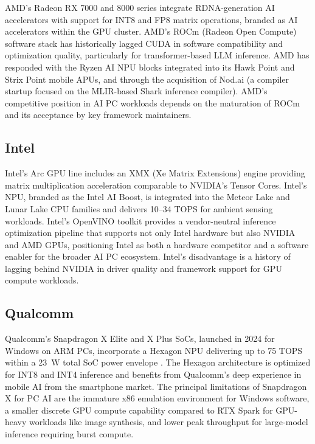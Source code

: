 \documentclass[conference]{IEEEtran}
\begin{document}
AMD's Radeon RX 7000 and 8000 series integrate RDNA-generation AI accelerators with support for INT8 and FP8 matrix operations, branded as AI accelerators within the GPU cluster. AMD's ROCm (Radeon Open Compute) software stack has historically lagged CUDA in software compatibility and optimization quality, particularly for transformer-based LLM inference. AMD has responded with the Ryzen AI NPU blocks integrated into its Hawk Point and Strix Point mobile APUs, and through the acquisition of Nod.ai (a compiler startup focused on the MLIR-based Shark inference compiler). AMD's competitive position in AI PC workloads depends on the maturation of ROCm and its acceptance by key framework maintainers.

\subsection{Intel}

Intel's Arc GPU line includes an XMX (Xe Matrix Extensions) engine providing matrix multiplication acceleration comparable to NVIDIA's Tensor Cores. Intel's NPU, branded as the Intel AI Boost, is integrated into the Meteor Lake and Lunar Lake CPU families and delivers 10--34 TOPS for ambient sensing workloads. Intel's OpenVINO toolkit provides a vendor-neutral inference optimization pipeline that supports not only Intel hardware but also NVIDIA and AMD GPUs, positioning Intel as both a hardware competitor and a software enabler for the broader AI PC ecosystem. Intel's disadvantage is a history of lagging behind NVIDIA in driver quality and framework support for GPU compute workloads.

\subsection{Qualcomm}

Qualcomm's Snapdragon X Elite and X Plus SoCs, launched in 2024 for Windows on ARM PCs, incorporate a Hexagon NPU delivering up to 75 TOPS within a 23~W total SoC power envelope \cite{qualcomm2024snapdragon}. The Hexagon architecture is optimized for INT8 and INT4 inference and benefits from Qualcomm's deep experience in mobile AI from the smartphone market. The principal limitations of Snapdragon X for PC AI are the immature x86 emulation environment for Windows software, a smaller discrete GPU compute capability compared to RTX Spark for GPU-heavy workloads like image synthesis, and lower peak throughput for large-model inference requiring burst compute.
\end{document}
